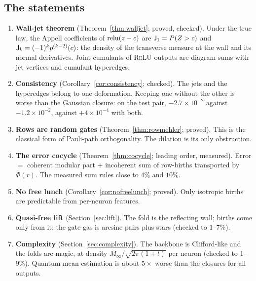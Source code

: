 \subsection{The statements}
\begin{enumerate}[leftmargin=*]
\item \textbf{Wall-jet theorem} (Theorem~\ref{thm:walljet}; proved, checked). Under the true law, the Appell coefficients of
$\operatorname{relu}(z-c)$ are $\mathsf J_1=P(Z>c)$ and $\mathsf J_k=(-1)^kp^{(k-2)}(c)$: the density of the transverse measure at the wall and its normal
derivatives. Joint cumulants of \textsc{ReLU} outputs are diagram sums with jet vertices and cumulant hyperedges.
\item \textbf{Consistency} (Corollary~\ref{cor:consistency}; checked). The jets and the hyperedges belong to one deformation. Keeping
one without the other is worse than the Gaussian closure: on the test pair, $-2.7\times10^{-2}$ against $-1.2\times10^{-2}$, against
$+4\times10^{-4}$ with both.
\item \textbf{Rows are random gates} (Theorem~\ref{thm:rowmehler}; proved). This is the classical form of Pauli-path orthogonality. The
dilation is its only obstruction.
\item \textbf{The error cocycle} (Theorem~\ref{thm:cocycle}; leading order, measured). Error $=$ coherent modular part $+$ incoherent sum
of row-births transported by $\Phi(r)$. The measured sum rules close to $4\%$ and $10\%$.
\item \textbf{No free lunch} (Corollary~\ref{cor:nofreelunch}; proved). Only isotropic births are predictable from per-neuron
features.
\item \textbf{Quasi-free lift} (Section~\ref{sec:lift}). The fold is the reflecting wall; births come only from it; the gate gas is arcsine
pairs plus stars (checked to $1$--$7\%$).
\item \textbf{Complexity} (Section~\ref{sec:complexity}). The backbone is Clifford-like and the folds are magic, at density
$M_\infty/\sqrt{2\pi(1+t)}$ per neuron (checked to $1$--$9\%$). Quantum mean estimation is about $5\times$ worse than the closures for
all outputs.
\end{enumerate}

